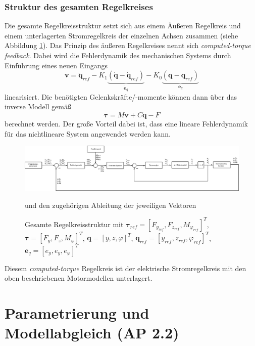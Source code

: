 \documentclass[10pt,a4paper]{iace.report}
\begin{document}
			\subsubsection{Struktur des gesamten Regelkreises}
				Die gesamte Regelkreisstruktur setzt sich aus einem Äußeren Regelkreis und einem unterlagerten Stromregelkreis der einzelnen Achsen zusammen (siehe Abbildung \ref{fig:Regelkreis}). Das Prinzip des äußeren Regelkreises nennt sich \textit{computed-torque feedback}. Dabei wird die Fehlerdynamik des mechanischen Systems durch Einführung eines neuen Eingangs
				\[ \bm{v}= \ddot{\bm{q}}_{ref} - K_{1}\underbrace{(\dot{\bm{q}} - \dot{\bm{q}}_{ref})}_{\dot{\bm{e}}_{q}}- K_{0}\underbrace{(\bm{q} - \bm{q}_{ref})}_{\bm{e}_{q}} \] 
				linearisiert. Die benötigten Gelenkskräfte/-momente können dann über das inverse Modell gemäß
				\[ \bm{\tau} =  M\bm{v} + C\dot{\bm{q}} - F\]
				berechnet werden. Der große Vorteil dabei ist, dass eine lineare Fehlerdynamik für das nichtlineare System angewendet werden kann.
				\begin{figure}[!h]
					\centering
					\includegraphics[width=0.99\linewidth]{./pics/Regelstruktur.png}
					\caption{Gesamte Regelkreisstruktur mit $ \bm{\tau}_{ref} = [F_{y_{ref}},F_{z_{ref}},M_{\varphi_{ref}}]^{T} $, $ \bm{\tau} = [F_{y},F_{z},M_{\varphi}]^{T} $,  $ \bm{q} = [y,z,\varphi]^{T} $, $ \bm{q}_{ref} = [y_{ref},z_{ref},\varphi_{ref}]^{T} $, $ \bm{e}_{q} = [e_{y},e_{y},e_{\varphi}]^{T} $} und den zugehörigen Ableitung der jeweiligen Vektoren
					\label{fig:Regelkreis}
				\end{figure}
				Diesem \textit{computed-torque} Regelkreis ist der elektrische Stromregelkreis mit den oben beschriebenen Motormodellen unterlagert.
	\clearpage	
	\section{Parametrierung und Modellabgleich (AP 2.2)}
%	
\end{document}
